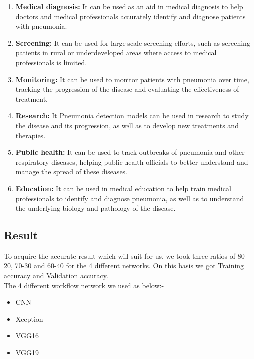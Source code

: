 \begin{enumerate}
	\item \textbf{Medical diagnosis:} It can be used as an aid in medical diagnosis to help doctors and medical professionals accurately identify and diagnose patients with pneumonia.
	
	\item \textbf{Screening:} It can be used for large-scale screening efforts, such as screening patients in rural or underdeveloped areas where access to medical professionals is limited.
	
	\item \textbf{Monitoring:} It can be used to monitor patients with pneumonia over time, tracking the progression of the disease and evaluating the effectiveness of treatment.
	
	\item \textbf{Research:} It Pneumonia detection models can be used in research to study the disease and its progression, as well as to develop new treatments and therapies.
	
	\item \textbf{Public health:} It can be used to track outbreaks of pneumonia and other respiratory diseases, helping public health officials to better understand and manage the spread of these diseases.
	
	\item \textbf{Education:} It can be used in medical education to help train medical professionals to identify and diagnose pneumonia, as well as to understand the underlying biology and pathology of the disease.
	
\end{enumerate}

\subsection{Result}

To acquire the accurate result which will suit for us, we took three ratios of 80-20, 70-30 and 60-40 for the 4 different networks. On this basis we got Training accuracy and Validation accuracy.\\

The 4 different workflow network we used as below:-

\begin{itemize}
	\item CNN
	\item Xception
	\item VGG16
	\item VGG19
\end{itemize}

